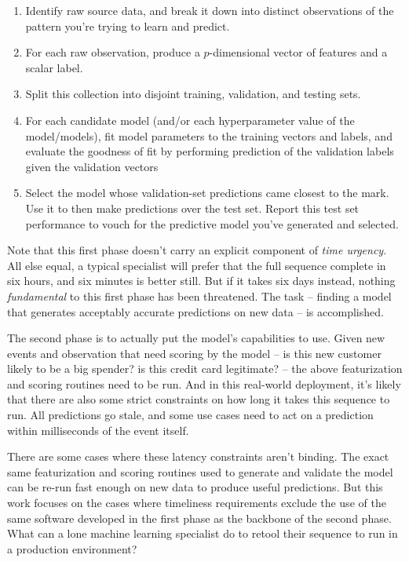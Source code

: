 \documentclass{article}
\begin{document}
\begin{enumerate}
\item Identify raw source data, and break it down into distinct observations of the pattern you're trying to learn and predict.
\item For each raw observation, produce a $p$-dimensional vector of features and a scalar label.
\item Split this collection into disjoint training, validation, and testing sets.
\item For each candidate model (and/or each hyperparameter value of the model/models), fit model parameters to the training vectors and labels, and evaluate the goodness of fit by performing prediction of the validation labels given the validation vectors
\item Select the model whose validation-set predictions came closest to the mark. Use it to then make predictions over the test set. Report this test set performance to vouch for the predictive model you've generated and selected.
\end{enumerate}

Note that this first phase doesn't carry an explicit component of \emph{time urgency}. All else equal, a typical specialist will prefer that the full sequence complete in six hours, and six minutes is better still. But if it takes six days instead, nothing \emph{fundamental} to this first phase has been threatened. The task -- finding a model that generates acceptably accurate predictions on new data -- is accomplished.

The second phase is to actually put the model's capabilities to use. Given new events and observation that need scoring by the model -- is this new customer likely to be a big spender? is this credit card legitimate? -- the above featurization and scoring routines need to be run. And in this real-world deployment, it's likely that there are also some strict constraints on how long it takes this sequence to run. All predictions go stale, and some use cases need to act on a prediction within milliseconds of the event itself.

There are some cases where these latency constraints aren't binding. The exact same featurization and scoring routines used to generate and validate the model can be re-run fast enough on new data to produce useful predictions. But this work focuses on the cases where timeliness requirements exclude the use of the same software developed in the first phase as the backbone of the second phase. What can a lone machine learning specialist do to retool their sequence to run in a production environment?
\end{document}
